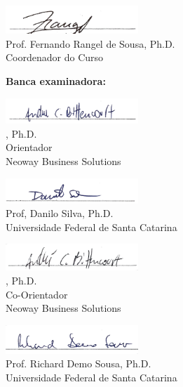 \begin{center}
	\includegraphics[width=5cm]{fig/sig-rangel.jpg}\\
	Prof. Fernando Rangel de Sousa, Ph.D.\\
	{\footnotesize Coordenador do Curso}
\end{center}
\medskip
\textbf{Banca examinadora:}
\bigskip
\begin{center}
	\includegraphics[width=5cm]{fig/sig-andre.png}\\
	\theadvisor, Ph.D.\\
	{\footnotesize Orientador}\\
	{\footnotesize Neoway Business Solutions}
\end{center}
\begin{center}
	\includegraphics[width=5cm]{fig/sig-danilo.png}\\
	Prof, Danilo Silva, Ph.D.\\
	{\footnotesize Universidade Federal de Santa Catarina}
\end{center}
\begin{center}
	\includegraphics[width=5cm]{fig/sig-penha.png}\\
	\thecoadvisor, Ph.D.\\
	{\footnotesize Co-Orientador}\\
	{\footnotesize Neoway Business Solutions}
\end{center}
\begin{center}
	\includegraphics[width=5cm]{fig/sig-richard.png}\\
	Prof. Richard Demo Sousa, Ph.D.\\
	{\footnotesize Universidade Federal de Santa Catarina}
\end{center}
\medskip